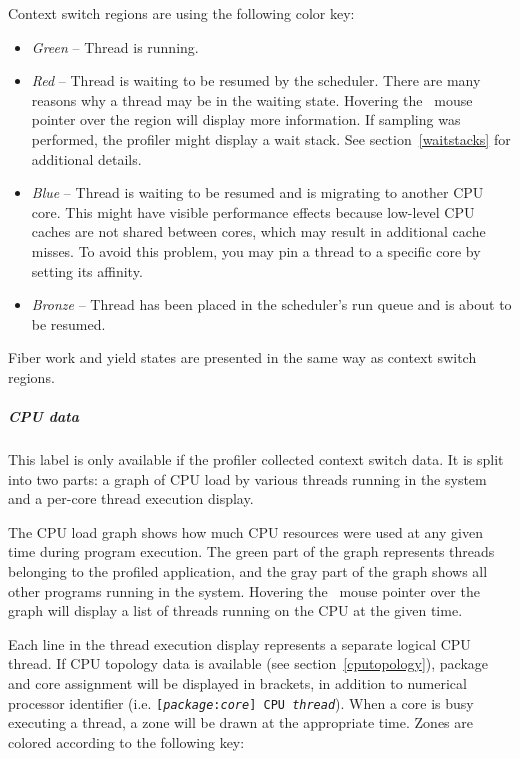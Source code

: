 \documentclass[hidelinks,titlepage,a4paper]{article}
\begin{document}
Context switch regions are using the following color key:

\begin{itemize}
\item \emph{Green} -- Thread is running.
\item \emph{Red} -- Thread is waiting to be resumed by the scheduler. There are many reasons why a thread may be in the waiting state. Hovering the \faMousePointer{}~mouse pointer over the region will display more information. If sampling was performed, the profiler might display a wait stack. See section~\ref{waitstacks} for additional details.
\item \emph{Blue} -- Thread is waiting to be resumed and is migrating to another CPU core. This might have visible performance effects because low-level CPU caches are not shared between cores, which may result in additional cache misses. To avoid this problem, you may pin a thread to a specific core by setting its affinity.
\item \emph{Bronze} -- Thread has been placed in the scheduler's run queue and is about to be resumed.
\end{itemize}

Fiber work and yield states are presented in the same way as context switch regions.

\subparagraph{CPU data}

This label is only available if the profiler collected context switch data. It is split into two parts: a graph of CPU load by various threads running in the system and a per-core thread execution display.

The CPU load graph shows how much CPU resources were used at any given time during program execution. The green part of the graph represents threads belonging to the profiled application, and the gray part of the graph shows all other programs running in the system. Hovering the \faMousePointer{}~mouse pointer over the graph will display a list of threads running on the CPU at the given time.

Each line in the thread execution display represents a separate logical CPU thread. If CPU topology data is available (see section~\ref{cputopology}), package and core assignment will be displayed in brackets, in addition to numerical processor identifier (i.e. \texttt{[\emph{package}:\emph{core}] CPU \emph{thread}}). When a core is busy executing a thread, a zone will be drawn at the appropriate time. Zones are colored according to the following key:
\end{document}
